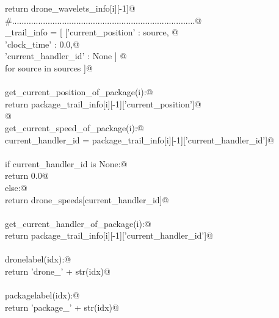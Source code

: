 \documentclass[10pt, english, oneside]{report}
\begin{document}
\begin{flushleft}
\begin{minipage}{\linewidth}
\begin{list}{}{}
\mbox{}\verb@         return drone_wavelets_info[i][-1]@\\
\mbox{}\verb@#.............................................................................@\\
\mbox{}\verb@package_trail_info  = [ [{'current_position'   : source, @\\
\mbox{}\verb@                          'clock_time'         : 0.0,@\\
\mbox{}\verb@                          'current_handler_id' : None }] @\\
\mbox{}\verb@                        for source in sources ]@\\
\mbox{}\verb@@\\
\mbox{}\verb@def get_current_position_of_package(i):@\\
\mbox{}\verb@         return package_trail_info[i][-1]['current_position']@\\
\mbox{}\verb@    @\\
\mbox{}\verb@def get_current_speed_of_package(i):@\\
\mbox{}\verb@         current_handler_id = package_trail_info[i][-1]['current_handler_id']@\\
\mbox{}\verb@@\\
\mbox{}\verb@         if current_handler_id is None:@\\
\mbox{}\verb@              return 0.0@\\
\mbox{}\verb@         else:@\\
\mbox{}\verb@              return drone_speeds[current_handler_id]@\\
\mbox{}\verb@@\\
\mbox{}\verb@def get_current_handler_of_package(i):@\\
\mbox{}\verb@         return package_trail_info[i][-1]['current_handler_id']@\\
\mbox{}\verb@@\\
\mbox{}\verb@def dronelabel(idx):@\\
\mbox{}\verb@    return 'drone_' + str(idx)@\\
\mbox{}\verb@@\\
\mbox{}\verb@def packagelabel(idx):@\\
\mbox{}\verb@    return 'package_' + str(idx)@\\
\mbox{}\verb@@\\
\mbox{}\verb@@{\NWsep}
\end{list}
\vspace{-1.5ex}
\footnotesize
\begin{list}{}{\setlength{\itemsep}{-\parsep}\setlength{\itemindent}{-\leftmargin}}

\end{list}
\end{minipage}
\end{flushleft}
\end{document}
